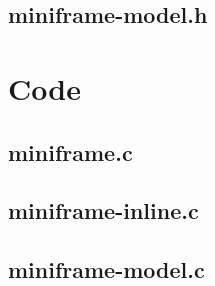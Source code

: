 \begin{scriptsize}
\begin{ttfamily}

\end{ttfamily}
\end{scriptsize}

\subsection{miniframe-model.h}

\begin{scriptsize}
\begin{ttfamily}

\end{ttfamily}
\end{scriptsize}

\section{Code}

\subsection{miniframe.c}

\begin{scriptsize}
\begin{ttfamily}

\end{ttfamily}
\end{scriptsize}

\subsection{miniframe-inline.c}

\begin{scriptsize}
\begin{ttfamily}

\end{ttfamily}
\end{scriptsize}

\subsection{miniframe-model.c}

\begin{scriptsize}
\begin{ttfamily}

\end{ttfamily}
\end{scriptsize}

